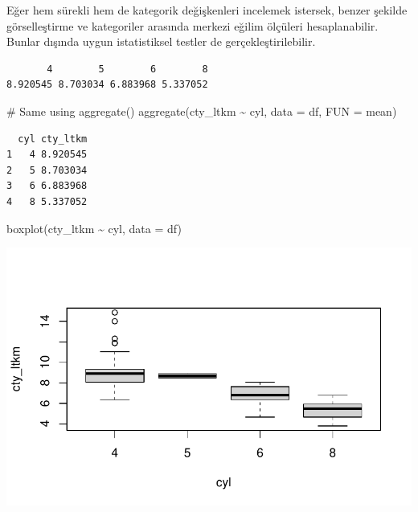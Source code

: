 \documentclass[
  letterpaper,
  DIV=11,
  numbers=noendperiod]{scrreprt}
\newenvironment{Shaded}{\begin{snugshade}}{\end{snugshade}}
\newcommand{\AttributeTok}[1]{\textcolor[rgb]{0.40,0.45,0.13}{#1}}
\newcommand{\CommentTok}[1]{\textcolor[rgb]{0.37,0.37,0.37}{#1}}
\newcommand{\FunctionTok}[1]{\textcolor[rgb]{0.28,0.35,0.67}{#1}}
\newcommand{\NormalTok}[1]{\textcolor[rgb]{0.00,0.23,0.31}{#1}}
\newcommand{\SpecialCharTok}[1]{\textcolor[rgb]{0.37,0.37,0.37}{#1}}
\begin{document}
Eğer hem sürekli hem de kategorik değişkenleri incelemek istersek,
benzer şekilde görselleştirme ve kategoriler arasında merkezi eğilim
ölçüleri hesaplanabilir. Bunlar dışında uygun istatistiksel testler de
gerçekleştirilebilir.

\begin{Shaded}
\end{Shaded}

\begin{verbatim}
       4        5        6        8 
8.920545 8.703034 6.883968 5.337052 
\end{verbatim}

\begin{Shaded}
\begin{Highlighting}[]
\CommentTok{\# Same using aggregate()}
\FunctionTok{aggregate}\NormalTok{(cty\_ltkm }\SpecialCharTok{\textasciitilde{}}\NormalTok{ cyl, }\AttributeTok{data =}\NormalTok{ df, }\AttributeTok{FUN =}\NormalTok{ mean)}
\end{Highlighting}
\end{Shaded}

\begin{verbatim}
  cyl cty_ltkm
1   4 8.920545
2   5 8.703034
3   6 6.883968
4   8 5.337052
\end{verbatim}

\begin{Shaded}
\begin{Highlighting}[]
\FunctionTok{boxplot}\NormalTok{(cty\_ltkm }\SpecialCharTok{\textasciitilde{}}\NormalTok{ cyl, }\AttributeTok{data =}\NormalTok{ df)}
\end{Highlighting}
\end{Shaded}

\includegraphics{data_analysis_files/figure-pdf/unnamed-chunk-4-1.pdf}
\end{document}
